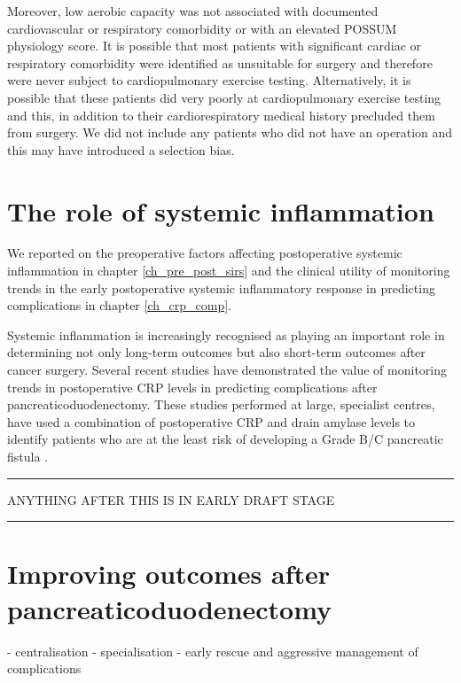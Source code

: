 Moreover, low aerobic capacity was not associated with documented cardiovascular or respiratory comorbidity or with an elevated POSSUM physiology score.
It is possible that most patients with significant cardiac or respiratory comorbidity were identified as unsuitable for surgery and therefore were never subject to cardiopulmonary exercise testing. 
Alternatively, it is possible that these patients did very poorly at cardiopulmonary exercise testing and this, in addition to their cardiorespiratory medical history precluded them from surgery.
We did not include any patients who did not have an operation and this may have introduced a selection bias.

\section{The role of systemic inflammation}
We reported on the preoperative factors affecting postoperative systemic inflammation in chapter \ref{ch_pre_post_sirs} and the clinical utility of monitoring trends in the early postoperative systemic inflammatory response in predicting complications in chapter \ref{ch_crp_comp}.

Systemic inflammation is increasingly recognised as playing an important role in determining not only long-term outcomes but also short-term outcomes after cancer surgery.
Several recent studies have demonstrated the value of monitoring trends in postoperative CRP levels in predicting complications after pancreaticoduodenectomy.
These studies performed at large, specialist centres, have used a combination of postoperative CRP and drain amylase levels to identify patients who are at the least risk of developing a Grade B/C pancreatic fistula \parencite{hiyoshi_usefulness_2013, ansorge_diagnostic_2014, kosaka_multivariate_2014}.

\bigskip \hrule

ANYTHING AFTER THIS IS IN EARLY DRAFT STAGE

\bigskip \hrule

\section{Improving outcomes after pancreaticoduodenectomy}



- centralisation
- specialisation
- early rescue and aggressive management of complications \parencite{gouma_rates_2000}

